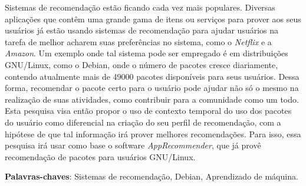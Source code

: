 \begin{resumo}

Sistemas de recomendação estão ficando cada vez mais populares. Diversas
aplicações que contêm uma grande gama de itens ou serviços para prover aos seus
usuários já estão usando sistemas de recomendação para ajudar usuários na
tarefa de melhor acharem suas preferências no sistema, como o \textit{Netflix} e
a \textit{Amazon}. Um exemplo onde tal sistema pode ser empregado é em
distribuições GNU/Linux, como
o Debian, onde o número de pacotes cresce diariamente,
contendo atualmente mais de 49000 pacotes disponíveis para seus usuários.
Dessa forma, recomendar o pacote certo para o usuário pode ajudar não só o mesmo
na realização de suas atividades, como contribuir para a comunidade como um todo.
Esta pesquisa visa então propor o uso de contexto temporal do uso dos pacotes do
usuário como diferencial na criação do seu perfil de recomendação, com a
hipótese de que tal informação irá prover melhores recomendações. Para isso,
essa pesquisa irá usar como base o software \textit{AppRecommender},
que já provê recomendação de pacotes para usuários GNU/Linux.


 \vspace{\onelineskip}
    
 \noindent
 \textbf{Palavras-chaves}: Sistemas de recomendação, Debian, Aprendizado de
 máquina.
\end{resumo}
